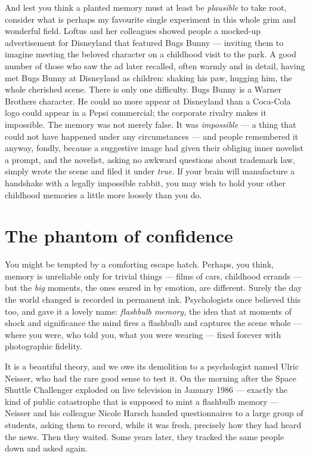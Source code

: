 And lest you think a planted memory must at least be \emph{plausible} to take root, consider what is perhaps my favourite single experiment in this whole grim and wonderful field. Loftus and her colleagues showed people a mocked-up advertisement for Disneyland that featured Bugs Bunny — inviting them to imagine meeting the beloved character on a childhood visit to the park. A good number of those who saw the ad later recalled, often warmly and in detail, having met Bugs Bunny at Disneyland as children: shaking his paw, hugging him, the whole cherished scene. There is only one difficulty. Bugs Bunny is a Warner Brothers character. He could no more appear at Disneyland than a Coca-Cola logo could appear in a Pepsi commercial; the corporate rivalry makes it impossible. The memory was not merely false. It was \emph{impossible} — a thing that could not have happened under any circumstances — and people remembered it anyway, fondly, because a suggestive image had given their obliging inner novelist a prompt, and the novelist, asking no awkward questions about trademark law, simply wrote the scene and filed it under \emph{true.} If your brain will manufacture a handshake with a legally impossible rabbit, you may wish to hold your other childhood memories a little more loosely than you do.

\section*{The phantom of confidence}

You might be tempted by a comforting escape hatch. Perhaps, you think, memory is unreliable only for trivial things — films of cars, childhood errands — but the \emph{big} moments, the ones seared in by emotion, are different. Surely the day the world changed is recorded in permanent ink. Psychologists once believed this too, and gave it a lovely name: \emph{flashbulb memory,} the idea that at moments of shock and significance the mind fires a flashbulb and captures the scene whole — where you were, who told you, what you were wearing — fixed forever with photographic fidelity.

It is a beautiful theory, and we owe its demolition to a psychologist named Ulric Neisser, who had the rare good sense to test it. On the morning after the Space Shuttle Challenger exploded on live television in January 1986 — exactly the kind of public catastrophe that is supposed to mint a flashbulb memory — Neisser and his colleague Nicole Harsch handed questionnaires to a large group of students, asking them to record, while it was fresh, precisely how they had heard the news. Then they waited. Some years later, they tracked the same people down and asked again.

